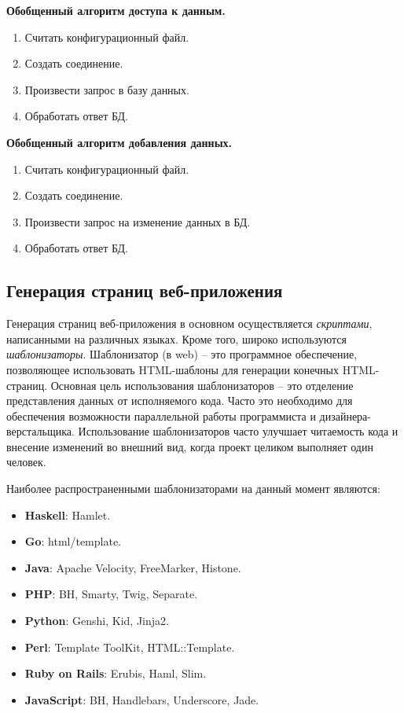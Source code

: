 \documentclass[a4paper]{article}
\begin{document}
\textbf{Обобщенный алгоритм доступа к данным.}
\begin{enumerate}
\item Считать конфигурационный файл.
\item Создать соединение.
\item Произвести запрос в базу данных.
\item Обработать ответ БД.
\end{enumerate}

\textbf{Обобщенный алгоритм добавления данных.}
\begin{enumerate}
\item Считать конфигурационный файл.
\item Создать соединение.
\item Произвести запрос на изменение данных в БД.
\item Обработать ответ БД.
\end{enumerate}

\subsection{Генерация страниц веб-приложения}

Генерация страниц веб-приложения в основном осуществляется \textit{скриптами}, написанными на различных языках. Кроме того, широко используются \textit{шаблонизаторы}. Шаблонизатор (в web) -- это программное обеспечение, позволяющее использовать HTML-шаблоны для генерации конечных HTML-страниц. Основная цель использования шаблонизаторов -- это отделение представления данных от исполняемого кода. Часто это необходимо для обеспечения возможности параллельной работы программиста и дизайнера-верстальщика. Использование шаблонизаторов часто улучшает читаемость кода и внесение изменений во внешний вид, когда проект целиком выполняет один человек.

Наиболее распространенными шаблонизаторами на данный момент являются:
\begin{itemize}
\item\textbf{Haskell}: Hamlet.
\item\textbf{Go}: html/template.
\item\textbf{Java}: Apache Velocity, FreeMarker, Histone.
\item\textbf{PHP}: BH, Smarty, Twig, Separate.
\item\textbf{Python}: Genshi, Kid, Jinja2.
\item\textbf{Perl}: Template ToolKit, HTML::Template.
\item\textbf{Ruby on Rails}: Erubis, Haml, Slim.
\item\textbf{JavaScript}: BH, Handlebars, Underscore, Jade.
\end{itemize}
\end{document}

